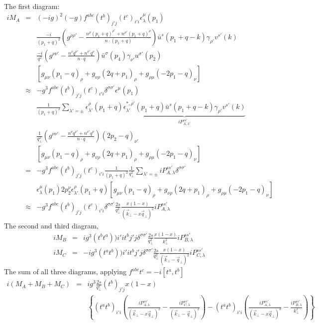 The first diagram:
\begin{eqnarray}
i M_A &=& (-ig)^2(-g)f^{abc}(t^b)_{j'j}(t^c)_{i'i} \epsilon_\lambda^\mu(p_1) \\\nonumber
&&\frac{-i}{(p_1+q)^2}\left(g^{\rho\rho'}-\frac{n^{\rho}(p_1+q)^{\rho'}+n^{\rho'}(p_1+q)^\rho}{n\cdot (p_1+q)}\right) \bar{u}^s(p_1+q-k)\gamma_{\rho'}v^{s'}(k) \\ \nonumber
&&\frac{-i}{q^2}\left(g^{\nu\nu'}-\frac{n^{\nu}q^{\nu'}+n^{\nu'}q^\nu}{n\cdot q}\right) \bar{u}^{\sigma}(p_4)\gamma_{\nu'}u^{\sigma'}(p_2) \\ \nonumber
&& \left[g_{\mu\nu}(p_1-q)_\rho + g_{\nu\rho}(2q+p_1)_\rho + g_{\rho\mu}(-2p_1 -q)_\nu \right]\\
&\approx& -g^3 f^{abc}(t^b)_{j'j}(t^c)_{i'i} \delta^{\sigma\sigma'} \epsilon^\mu(p_1) \\\nonumber
&&\frac{1}{(p_1+q)^2} \sum_{\lambda'=\pm}\epsilon_{\lambda'}^{\rho}(p_1+q)\underbrace{\epsilon_{\lambda'}^{*,\rho'}(p_1+q) \bar{u}^s(p_1+q-k)\gamma_{\rho'}v^{s'}(k)}_{iP_{A,\lambda'}^{ss'}} \\ \nonumber
&&\frac{1}{q_\perp^2}\left(g^{\nu\nu'}-\frac{n^{\nu}q^{\nu'}+n^{\nu'}q^\nu}{n\cdot q}\right) (2p_2-q)_{\nu'} \\ \nonumber
&& \left[g_{\mu\nu}(p_1-q)_\rho + g_{\nu\rho}(2q+p_1)_\rho + g_{\rho\mu}(-2p_1 -q)_\nu \right] \\
&=& -g^3 f^{abc}(t^b)_{j'j}(t^c)_{i'i} \frac{1}{(p_1+q)^2}\frac{1}{q_\perp^2} \sum_{\lambda'=\pm}iP_{A,\lambda}^{ss'} \delta^{\sigma\sigma'}  \\ \nonumber
&& \epsilon_\lambda^\mu(p_1)2p_2^{\nu} \epsilon_{\lambda'}^{\rho}(p_1+q) \left[g_{\mu\nu}(p_1-q)_\rho + g_{\nu\rho}(2q+p_1)_\rho + g_{\rho\mu}(-2p_1 -q)_\nu \right]\\
&\approx& -g^3 f^{abc}(t^b)_{j'j}(t^c)_{i'i}\delta^{\sigma\sigma'}\frac{2s}{q_\perp^2} \frac{x(1-x)}{(\vec{k}_\perp-x \vec{q}_\perp)^2} iP_{A,\lambda}^{ss'} 
\end{eqnarray}
The second and third diagram,
\begin{eqnarray}
i M_B &=& i g^3 (t^b t^a)){i'i} t^b{j'j} \delta^{\sigma\sigma'} \frac{2s}{q_\perp^2} \frac{x(1-x)}{k_\perp^2}  iP_{B,\lambda}^{ss'} \\
i M_C &=& -i g^3 (t^a t^b)){i'i} t^b{j'j} \delta^{\sigma\sigma'} \frac{2s}{q_\perp^2} \frac{x(1-x)}{(\vec{k}_\perp-\vec{q}_\perp)^2}  iP_{C,\lambda}^{ss'} 
\end{eqnarray}
The sum of all three diagrams, applying $f^{abc}t^c = -i[t^a, t^b]$
\begin{eqnarray}
i (M_A+M_B+M_C) &=& ig^3 \frac{2s}{q_\perp^2} (t^b)_{j'j} x(1-x)\\\nonumber
&&\left\{(t^a t^b)_{i'i} \left(\frac{iP_{A,\lambda}^{ss'} }{(\vec{k}_\perp-x \vec{q}_\perp)^2} - \frac{iP_{C,\lambda}^{ss'}}{(\vec{k}_\perp-\vec{q}_\perp)^2}\right) -(t^a t^b)_{i'i}\left(\frac{iP_{A,\lambda}^{ss'} }{(\vec{k}_\perp-x \vec{q}_\perp)^2} - \frac{iP_{B,\lambda}^{ss'}}{k_\perp^2}\right) \right\}
\end{eqnarray}


